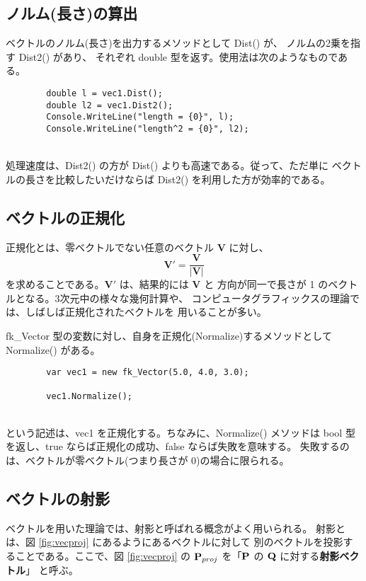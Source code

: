 \subsection{ノルム(長さ)の算出}
ベクトルのノルム(長さ)を出力するメソッドとして Dist() が、
ノルムの2乗を指す Dist2() があり、
それぞれ double 型を返す。使用法は次のようなものである。
\\
\begin{screen}
\begin{verbatim}
        double l = vec1.Dist();
        double l2 = vec1.Dist2();
        Console.WriteLine("length = {0}", l);
        Console.WriteLine("length^2 = {0}", l2);
\end{verbatim}
\end{screen}
~ \\
処理速度は、Dist2() の方が Dist() よりも高速である。従って、ただ単に
ベクトルの長さを比較したいだけならば Dist2() を利用した方が効率的である。

\subsection{ベクトルの正規化}
正規化とは、零ベクトルでない任意のベクトル \(\mathbf{V}\) に対し、
\[
	\mathbf{V}' = \frac{\mathbf{V}}{|\mathbf{V}|}
\]
を求めることである。\(\mathbf{V}'\) は、結果的には \(\mathbf{V}\) と
方向が同一で長さが 1 のベクトルとなる。3次元中の様々な幾何計算や、
コンピュータグラフィックスの理論では、しばしば正規化されたベクトルを
用いることが多い。

fk\_Vector 型の変数に対し、自身を正規化(Normalize)するメソッドとして
Normalize() がある。
\\
\begin{screen}
\begin{verbatim}
        var vec1 = new fk_Vector(5.0, 4.0, 3.0);

        vec1.Normalize();
\end{verbatim}
\end{screen}
~ \\
という記述は、vec1 を正規化する。ちなみに、Normalize() メソッドは
bool 型を返し、true ならば正規化の成功、false ならば失敗を意味する。
失敗するのは、ベクトルが零ベクトル(つまり長さが 0)の場合に限られる。

\subsection{ベクトルの射影}
ベクトルを用いた理論では、射影と呼ばれる概念がよく用いられる。
射影とは、図 \ref{fig:vecproj} にあるようにあるベクトルに対して
別のベクトルを投影することである。ここで、図 \ref{fig:vecproj}
の \(\mathbf{P}_{proj}\) を「\(\mathbf{P}\) の \(\mathbf{Q}\) に対する\textbf{射影ベクトル}」
と呼ぶ。

